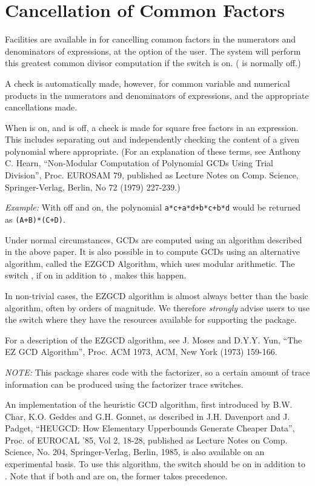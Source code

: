 \section{Cancellation of Common Factors}
\hypertarget{switch:GCD}{}
Facilities are available in {\REDUCE} for cancelling common factors in the
numerators and denominators of expressions, at the option of the user. The
system will perform this greatest common divisor computation if the switch
 is on. ( is normally off.)

A check is automatically made, however, for common variable and numerical
products in the numerators and denominators of expressions, and the
appropriate cancellations made.

When  is on, and  is off, a check is made for square
free factors in an expression.  This includes separating out and
independently checking the content of a given polynomial where
appropriate. (For an explanation of these terms, see Anthony C. Hearn,
``Non-Modular Computation of Polynomial GCDs Using Trial Division'', Proc.
EUROSAM 79, published as Lecture Notes on Comp.  Science, Springer-Verlag,
Berlin, No 72 (1979) 227-239.)

\textit{Example:} With  off and 
on,
the polynomial \texttt{a*c+a*d+b*c+b*d} would be returned as \texttt{(A+B)*(C+D)}.

\hypertarget{switch:EZGCD}{}
Under normal circumstances, GCDs are computed using an algorithm described
in the above paper. It is also possible in {\REDUCE} to compute GCDs using
an alternative algorithm, called the EZGCD Algorithm, which uses modular
arithmetic.  The switch , if on in addition to
, makes this happen.

In non-trivial cases, the EZGCD algorithm is almost always better
than the basic algorithm, often by orders of magnitude.  We therefore
\emph{strongly} advise users to use the  switch where they have the
resources available for supporting the package.

For a description of the EZGCD algorithm, see J. Moses and D.Y.Y. Yun,
``The EZ GCD Algorithm'', Proc. ACM 1973, ACM, New York (1973) 159-166.

\textit{NOTE:}
This package shares code with the factorizer, so a certain amount of trace
information can be produced using the factorizer trace switches.

\hypertarget{switch:HEUGCD}{}
An implementation of the heuristic GCD algorithm, first introduced by B.W.
Char, K.O.  Geddes and G.H.  Gonnet, as described in J.H.  Davenport and
J.  Padget, ``HEUGCD:  How Elementary Upperbounds Generate Cheaper Data'',
Proc. of EUROCAL '85, Vol 2, 18-28, published as Lecture Notes on Comp.
Science, No. 204, Springer-Verlag, Berlin, 1985, is also available on an
experimental basis.  To use this algorithm, the switch 
should be on in addition to .  Note that
if both  and  are on, the former takes precedence.


